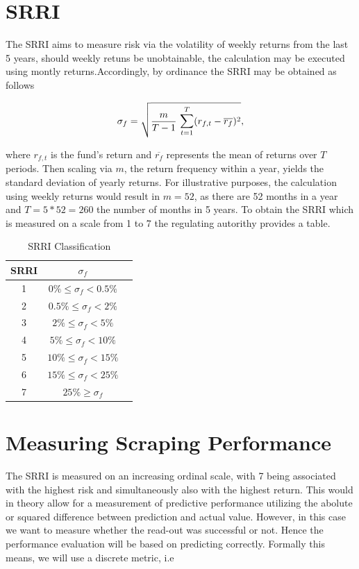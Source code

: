 \documentclass[aodsor,preprint]{imsart}
\numberwithin{equation}{section}
\theoremstyle{plain}
\begin{document}
\newpage

\section{SRRI}

The SRRI aims to measure risk via the volatility of weekly returns from the last 5 years, should weekly retuns be unobtainable, the calculation may be executed using montly returns.Accordingly, by ordinance the SRRI may be obtained as follows

\[
\sigma_f = \sqrt{\frac{m}{T - 1}\text{ }\mathlarger{\sum}_{t = 1}^{T} (r_{f, t} - \overline{r_f})^2},
\]

where $r_{f, t}$ is the fund's return and $\overline{r_f}$ represents the mean of returns over $T$ periods. Then scaling via  $m$, the return frequency within a year, yields the standard deviation of yearly returns. For illustrative purposes, the calculation using weekly returns would result in $m = 52$, as there are 52 months in a year and $T = 5 * 52 = 260$ the number of months in 5 years. To obtain the SRRI which is measured on a scale from 1 to 7 the regulating autorithy provides a table.
\begin{table}[H]
\begin{center}
	\caption{SRRI Classification}
\begin{tabular}{|c|c|c}
	\hline
	SRRI & $\sigma_f$ \\
	\hline
	1 & $0\% \leq\sigma_f<0.5\%$\\
	\hline
	2 & $0.5\%\leq\sigma_f<2\%$\\
	\hline
	3 & $2\%\leq\sigma_f<5\%$\\
	\hline
	4 & $5\%\leq\sigma_f<10\%$\\
	\hline
	5 & $10\%\leq\sigma_f<15\%$\\
	\hline
	6 & $15\%\leq\sigma_f<25\%$\\
	\hline
	7 & $25\%\geq\sigma_f$\\
	\hline
\end{tabular}
\end{center}
\end{table}

\section{Measuring Scraping Performance}

The SRRI is measured on an increasing ordinal scale, with 7 being associated with the highest risk and simultaneously also with the highest return. This would in theory allow for a measurement of predictive performance utilizing the abolute or squared difference between prediction and actual value. However, in this case we want to measure whether the read-out was successful or not. Hence the performance evaluation will be based on predicting correctly. Formally this means, we will use a discrete metric, i.e
\end{document}
